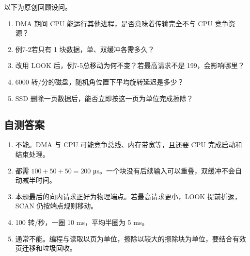以下为原创回顾设问。

\begin{enumerate}
\def\labelenumi{\arabic{enumi}.}
\tightlist
\item
  DMA 期间 CPU 能运行其他进程，是否意味着传输完全不与 CPU 竞争资源？
\item
  例7-2若只有 1 块数据，单、双缓冲各需多久？
\item
  改用 LOOK 后，例7-5总移动为何不变？若最高请求不是 199，会影响哪里？
\item
  6000 转/分的磁盘，随机角位置下平均旋转延迟是多少？
\item
  SSD 删除一页数据后，能否立即按这一页为单位完成擦除？
\end{enumerate}

\subsection{自测答案}\label{os-c07-h261}

\begin{enumerate}
\def\labelenumi{\arabic{enumi}.}
\tightlist
\item
  不能。DMA 与 CPU 可能竞争总线、内存带宽等，且还要 CPU 完成启动和结束处理。
\item
  都需 \(100+50+50=200\) μs。一个块没有后续输入可以重叠，双缓冲不会自动减半时间。
\item
  本题最后的向内请求正好为物理端点。若最高请求更小，LOOK 提前折返，SCAN 仍按端点规则移动。
\item
  100 转/秒，一圈 10 ms，平均半圈为 5 ms。
\item
  通常不能。编程与读取以页为单位，擦除以较大的擦除块为单位，要结合有效页迁移和垃圾回收。
\end{enumerate}
